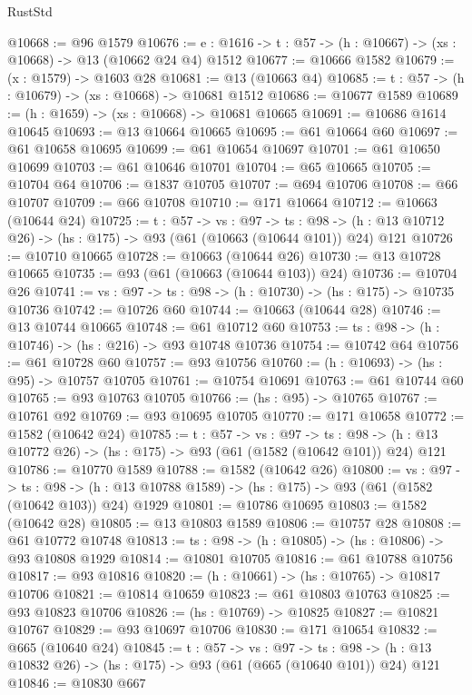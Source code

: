 \begin{lexlean}{RustStd}
\begin{coremodule}
@10668 := @96 @1579
@10676 := {e : @1616} -> {t : @57} -> (h : @10667) -> (xs : @10668) -> @13 (@10662 @24 @4) @1512
@10677 := @10666 @1582
@10679 := (x : @1579) -> @1603 @28
@10681 := @13 (@10663 @4)
@10685 := {t : @57} -> (h : @10679) -> (xs : @10668) -> @10681 @1512
@10686 := @10677 @1589
@10689 := (h : @1659) -> (xs : @10668) -> @10681 @10665
@10691 := @10686 @1614 @10645
@10693 := @13 @10664 @10665
@10695 := @61 @10664 @60
@10697 := @61 @10658 @10695
@10699 := @61 @10654 @10697
@10701 := @61 @10650 @10699
@10703 := @61 @10646 @10701
@10704 := @65 @10665
@10705 := @10704 @64
@10706 := @1837 @10705
@10707 := @694 @10706
@10708 := @66 @10707
@10709 := @66 @10708
@10710 := @171 @10664
@10712 := @10663 (@10644 @24)
@10725 := {t : @57} ->
  {vs : @97} ->
  {ts : @98} -> (h : @13 @10712 @26) -> (hs : @175) -> @93 (@61 (@10663 (@10644 @101)) @24) @121
@10726 := @10710 @10665
@10728 := @10663 (@10644 @26)
@10730 := @13 @10728 @10665
@10735 := @93 (@61 (@10663 (@10644 @103)) @24)
@10736 := @10704 @26
@10741 := {vs : @97} -> {ts : @98} -> (h : @10730) -> (hs : @175) -> @10735 @10736
@10742 := @10726 @60
@10744 := @10663 (@10644 @28)
@10746 := @13 @10744 @10665
@10748 := @61 @10712 @60
@10753 := {ts : @98} -> (h : @10746) -> (hs : @216) -> @93 @10748 @10736
@10754 := @10742 @64
@10756 := @61 @10728 @60
@10757 := @93 @10756
@10760 := (h : @10693) -> (hs : @95) -> @10757 @10705
@10761 := @10754 @10691
@10763 := @61 @10744 @60
@10765 := @93 @10763 @10705
@10766 := (hs : @95) -> @10765
@10767 := @10761 @92
@10769 := @93 @10695 @10705
@10770 := @171 @10658
@10772 := @1582 (@10642 @24)
@10785 := {t : @57} ->
  {vs : @97} ->
  {ts : @98} -> (h : @13 @10772 @26) -> (hs : @175) -> @93 (@61 (@1582 (@10642 @101)) @24) @121
@10786 := @10770 @1589
@10788 := @1582 (@10642 @26)
@10800 := {vs : @97} ->
  {ts : @98} -> (h : @13 @10788 @1589) -> (hs : @175) -> @93 (@61 (@1582 (@10642 @103)) @24) @1929
@10801 := @10786 @10695
@10803 := @1582 (@10642 @28)
@10805 := @13 @10803 @1589
@10806 := @10757 @28
@10808 := @61 @10772 @10748
@10813 := {ts : @98} -> (h : @10805) -> (hs : @10806) -> @93 @10808 @1929
@10814 := @10801 @10705
@10816 := @61 @10788 @10756
@10817 := @93 @10816
@10820 := (h : @10661) -> (hs : @10765) -> @10817 @10706
@10821 := @10814 @10659
@10823 := @61 @10803 @10763
@10825 := @93 @10823 @10706
@10826 := (hs : @10769) -> @10825
@10827 := @10821 @10767
@10829 := @93 @10697 @10706
@10830 := @171 @10654
@10832 := @665 (@10640 @24)
@10845 := {t : @57} ->
  {vs : @97} ->
  {ts : @98} -> (h : @13 @10832 @26) -> (hs : @175) -> @93 (@61 (@665 (@10640 @101)) @24) @121
@10846 := @10830 @667

\end{coremodule}
\end{lexlean}
